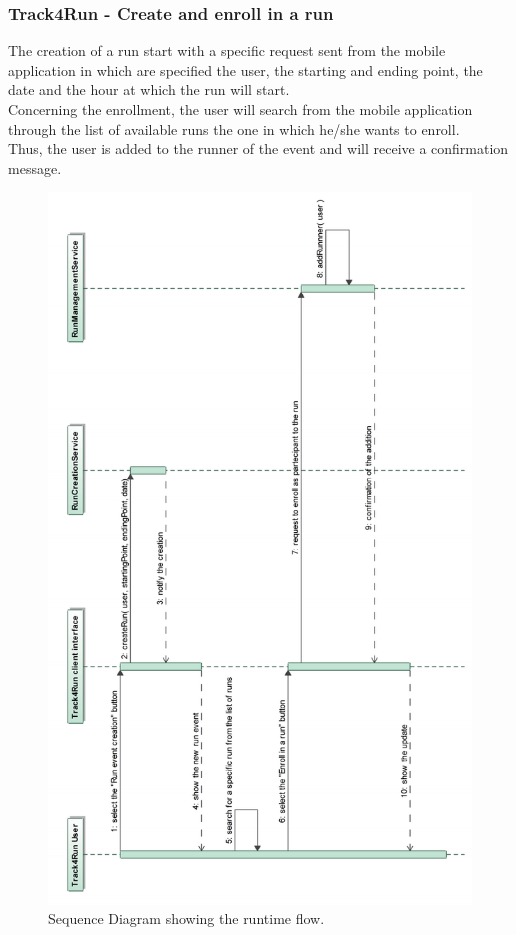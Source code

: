 \documentclass[a4paper]{article}
\begin{document}
\subsubsection{Track4Run - Create and enroll in a run}
The creation of a run start with a specific request sent from the mobile application in which are specified the user, the starting and ending point, the date and the hour at which the run will start. \\
Concerning the enrollment, the user will search from the mobile application through the list of available runs the one in which he/she wants to enroll. \\
Thus, the user is added to the runner of the event and will receive a confirmation message.

\begin{figure}[H]
    \centering
    \includegraphics[width=\linewidth]{SequenceDiagram-CreateAndEnrollToARunEvent}
    \caption{Sequence Diagram showing the runtime flow.}
    \label{fig:my_label}
\end{figure}
\clearpage
\end{document}
